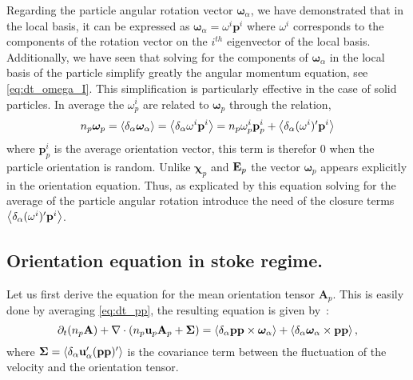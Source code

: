 Regarding the particle angular rotation vector $\bm\omega_\alpha$, we have demonstrated that in the local basis, it can be expressed as $\bm\omega_\alpha  = \omega^i \textbf{p}^i$ where $\omega^i$ corresponds to the components of the rotation vector on the $i^{th}$ eigenvector of the local basis.
Additionally, we have seen that solving for the components of $\bm\omega_\alpha$ in the local basis of the particle simplify greatly the angular momentum equation, see \ref{eq:dt_omega_I}.  
This simplification is particularly effective in the case of solid particles. 
In average the $\omega^i_p$ are related to $\bm\omega_p$ through the relation, 
\begin{equation*}
    n_p \bm\omega_p
    = \left<\delta_\alpha \bm\omega_\alpha\right>
    =\left<\delta_\alpha \omega^i \textbf{p}^i\right>
    =n_p \omega^i_p   \textbf{p}_p^i
    +\left<\delta_\alpha (\omega^i)' \textbf{p}^i\right>
    \label{eq:omega_p_local}
\end{equation*}
where $\textbf{p}_p^i$ is the average orientation vector, this term is therefor $0$ when the particle orientation is random.  
Unlike $\bm\chi_p$ and $\textbf E_p$ the vector $\bm\omega_p$ appears explicitly in the orientation equation. 
Thus, as explicated by this equation solving for the average of the particle angular rotation introduce the need of the closure terms $\left<\delta_\alpha (\omega^i)' \textbf{p}^i\right>$.

\subsection{Orientation equation in stoke regime.}

Let us first derive the equation for the mean orientation tensor $\textbf{A}_p$. 
This is easily done by averaging \ref{eq:dt_pp}, the resulting equation is given by~:
\begin{equation}
    \partial_t (n_p\textbf{A})
    + \mathbf{\nabla}\cdot (
        n_p\textbf{u}_p\textbf{A}_p
        + \mathbf{\Sigma}
        )
    =
    \left<\delta_\alpha \textbf{pp} \times \bm\omega_\alpha\right>
    + \left<\delta_\alpha \bm\omega_\alpha \times \textbf{pp}\right>,
    \label{eq:avg_dt_pp_alpha}
\end{equation}
where $\mathbf{\Sigma} = \left<\delta_\alpha \textbf{u}'_\alpha(\textbf{pp})'\right>$ is the covariance term between the fluctuation of the velocity and the orientation tensor.

